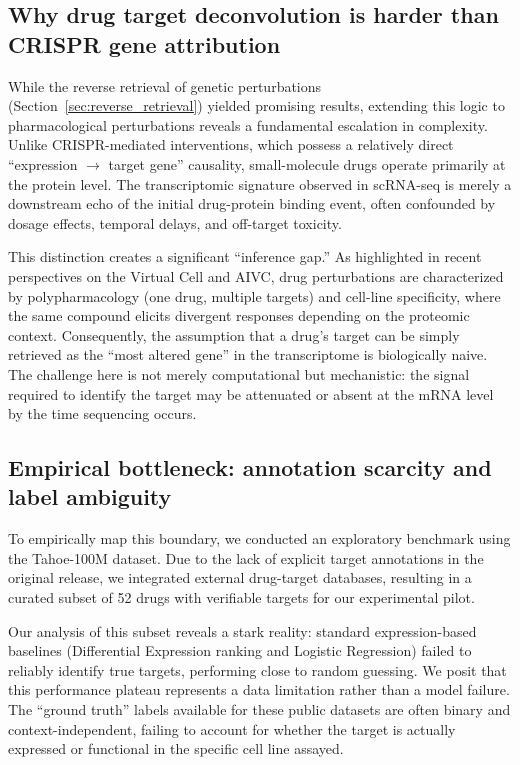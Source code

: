 \documentclass{article}
\begin{document}
\subsection{Why drug target deconvolution is harder than CRISPR gene attribution}

While the reverse retrieval of genetic perturbations (Section~\ref{sec:reverse_retrieval}) yielded promising results, extending this logic to pharmacological perturbations reveals a fundamental escalation in complexity. Unlike CRISPR-mediated interventions, which possess a relatively direct ``expression $\to$ target gene'' causality, small-molecule drugs operate primarily at the protein level. The transcriptomic signature observed in scRNA-seq is merely a downstream echo of the initial drug-protein binding event, often confounded by dosage effects, temporal delays, and off-target toxicity.

This distinction creates a significant ``inference gap.'' As highlighted in recent perspectives on the Virtual Cell and AIVC, drug perturbations are characterized by polypharmacology (one drug, multiple targets) and cell-line specificity, where the same compound elicits divergent responses depending on the proteomic context. Consequently, the assumption that a drug's target can be simply retrieved as the ``most altered gene'' in the transcriptome is biologically naive. The challenge here is not merely computational but mechanistic: the signal required to identify the target may be attenuated or absent at the mRNA level by the time sequencing occurs.

\subsection{Empirical bottleneck: annotation scarcity and label ambiguity}

To empirically map this boundary, we conducted an exploratory benchmark using the Tahoe-100M dataset. Due to the lack of explicit target annotations in the original release, we integrated external drug-target databases, resulting in a curated subset of 52 drugs with verifiable targets for our experimental pilot.

Our analysis of this subset reveals a stark reality: standard expression-based baselines (Differential Expression ranking and Logistic Regression) failed to reliably identify true targets, performing close to random guessing. We posit that this performance plateau represents a data limitation rather than a model failure. The ``ground truth'' labels available for these public datasets are often binary and context-independent, failing to account for whether the target is actually expressed or functional in the specific cell line assayed.
\end{document}
